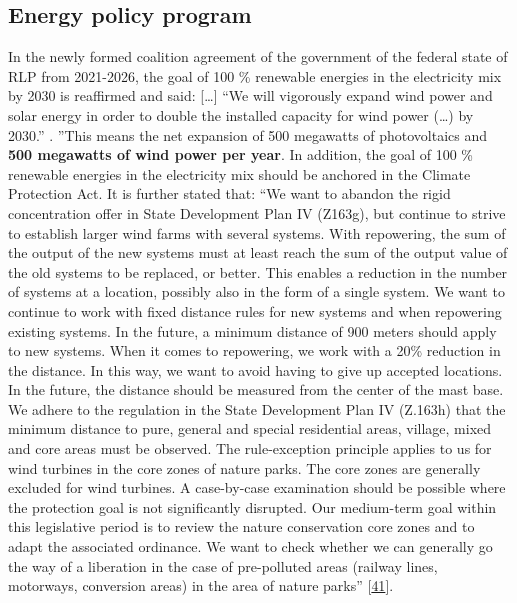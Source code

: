 \documentclass[a4paper,11pt]{article}
\begin{document}
\hypertarget{energy-policy-program}{%
\subsection{Energy policy program}\label{energy-policy-program}}

In the newly formed coalition agreement of the government of the federal state of RLP from 2021-2026, the goal of 100 \% renewable energies in the electricity mix by 2030 is reaffirmed and said: {[}\ldots{]} ``We will vigorously expand wind power and solar energy in order to double the installed capacity for wind power (\ldots) by 2030.'' . ''This means the net expansion of 500 megawatts of photovoltaics and \textbf{500 megawatts of wind power per year}. In addition, the goal of 100 \% renewable energies in the electricity mix should be anchored in the Climate Protection Act. It is further stated that:
``We want to abandon the rigid concentration offer in State Development Plan IV (Z163g), but continue to strive to establish larger wind farms with several systems. With repowering, the sum of the output of the new systems must at least reach the sum of the output value of the old systems to be replaced, or better. This enables a reduction in the number of systems at a location, possibly also in the form of a single system. We want to continue to work with fixed distance rules for new systems and when repowering existing systems. In the future, a minimum distance of 900 meters should apply to new systems. When it comes to repowering, we work with a 20\% reduction in the distance. In this way, we want to avoid having to give up accepted locations. In the future, the distance should be measured from the center of the mast base. We adhere to the regulation in the State Development Plan IV (Z.163h) that the minimum distance to pure, general and special residential areas, village, mixed and core areas must be observed. The rule-exception principle applies to us for wind turbines in the core zones of nature parks. The core zones are generally excluded for wind turbines. A case-by-case examination should be possible where the protection goal is not significantly disrupted. Our medium-term goal within this legislative period is to review the nature conservation core zones and to adapt the associated ordinance. We want to check whether we can generally go the way of a liberation in the case of pre-polluted areas (railway lines, motorways, conversion areas) in the area of nature parks'' {[}\protect\hyperlink{ref-SPD.2021}{41}{]}.
\end{document}
